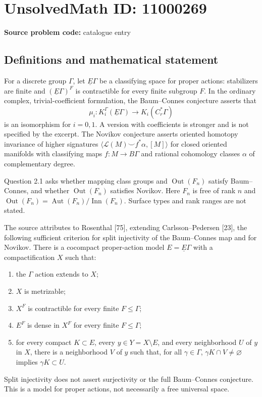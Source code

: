 \documentclass[11pt]{article}
\begin{document}
\section*{UnsolvedMath ID: 11000269}
\textbf{Source problem code:} catalogue entry
\subsection{Definitions and mathematical statement}
For a discrete group $\Gamma$, let $\underline E\Gamma$ be a classifying space for proper actions: stabilizers are finite and $(\underline E\Gamma)^F$ is contractible for every finite subgroup $F$. In the ordinary complex, trivial-coefficient formulation, the Baum--Connes conjecture asserts that
\[
 \mu_i:K_i^\Gamma(\underline E\Gamma)\longrightarrow K_i(C_r^*\Gamma)
\]
is an isomorphism for $i=0,1$. A version with coefficients is stronger and is not specified by the excerpt. The Novikov conjecture asserts oriented homotopy invariance of higher signatures $\langle\mathcal L(M)\smile f^*\alpha,[M]\rangle$ for closed oriented manifolds with classifying maps $f:M\to B\Gamma$ and rational cohomology classes $\alpha$ of complementary degree.

Question 2.1 asks whether mapping class groups and $\operatorname{Out}(F_n)$ satisfy Baum--Connes, and whether $\operatorname{Out}(F_n)$ satisfies Novikov. Here $F_n$ is free of rank $n$ and $\operatorname{Out}(F_n)=\operatorname{Aut}(F_n)/\operatorname{Inn}(F_n)$. Surface types and rank ranges are not stated.

The source attributes to Rosenthal [75], extending Carlsson--Pedersen [23], the following sufficient criterion for split injectivity of the Baum--Connes map and for Novikov. There is a cocompact proper-action model $E=\underline E\Gamma$ with a compactification $X$ such that:
\begin{enumerate}
\item the $\Gamma$ action extends to $X$;
\item $X$ is metrizable;
\item $X^F$ is contractible for every finite $F\leq\Gamma$;
\item $E^F$ is dense in $X^F$ for every finite $F\leq\Gamma$;
\item for every compact $K\subset E$, every $y\in Y=X\setminus E$, and every neighborhood $U$ of $y$ in $X$, there is a neighborhood $V$ of $y$ such that, for all $\gamma\in\Gamma$, $\gamma K\cap V\ne\varnothing$ implies $\gamma K\subset U$.
\end{enumerate}
Split injectivity does not assert surjectivity or the full Baum--Connes conjecture. This is a model for proper actions, not necessarily a free universal space.
\end{document}
